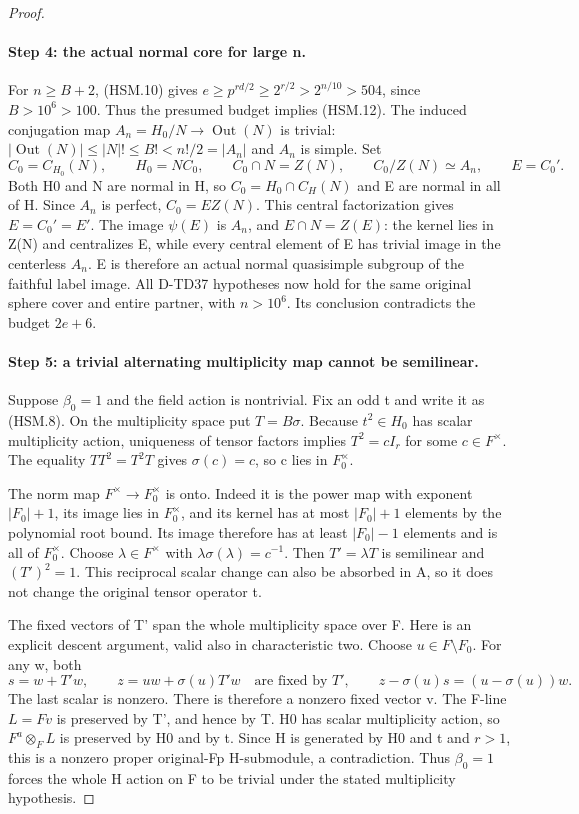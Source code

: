 \begin{proof}
\paragraph{Step 4: the actual normal core for large n.}
For \(n\ge B+2\), (HSM.10) gives
\(e\ge p^{rd/2}\ge2^{r/2}>2^{n/10}>504\), since
\(B>10^6>100\).  Thus the presumed budget implies (HSM.12).
The induced conjugation map
\(A_n=H_0/N\to\operatorname{Out}(N)\) is trivial:
\(|\operatorname{Out}(N)|\le|N|!\le B!<n!/2=|A_n|\)
and \(A_n\) is simple.  Set
\[
 C_0=C_{H_0}(N),\qquad H_0=NC_0,\qquad
 C_0\cap N=Z(N),\qquad C_0/Z(N)\simeq A_n,
 \qquad E=C_0'.
 \tag{HSM.13}
\]
Both H0 and N are normal in H, so \(C_0=H_0\cap C_H(N)\)
and E are normal in all of H.  Since \(A_n\) is perfect,
\(C_0=E Z(N)\).  This central factorization gives
\(E=C_0'=E'\).  The image \(\psi(E)\) is \(A_n\),
and \(E\cap N=Z(E)\): the kernel lies in Z(N) and
centralizes E, while every central element of E has trivial
image in the centerless \(A_n\).  E is therefore an actual
normal quasisimple subgroup of the faithful label image.
All D-TD37 hypotheses now hold for the same original sphere
cover and entire partner, with \(n>10^6\).  Its conclusion
contradicts the budget \(2e+6\).

\paragraph{Step 5: a trivial alternating multiplicity map cannot be semilinear.}
Suppose \(\beta_0=1\) and the field action is nontrivial.
Fix an odd t and write it as (HSM.8).  On the multiplicity
space put \(T=B\sigma\).  Because \(t^2\in H_0\)
has scalar multiplicity action, uniqueness of tensor factors
implies \(T^2=cI_r\) for some \(c\in F^\times\).
The equality \(TT^2=T^2T\) gives \(\sigma(c)=c\),
so c lies in \(F_0^\times\).

The norm map \(F^\times\to F_0^\times\) is onto.
Indeed it is the power map with exponent \(|F_0|+1\),
its image lies in \(F_0^\times\), and its kernel has
at most \(|F_0|+1\) elements by the polynomial root bound.
Its image therefore has at least \(|F_0|-1\) elements and
is all of \(F_0^\times\).  Choose \(\lambda\in F^\times\) with
\(\lambda\sigma(\lambda)=c^{-1}\).  Then
\(T'=\lambda T\) is semilinear and \((T')^2=1\).
This reciprocal scalar change can also be absorbed in A, so it
does not change the original tensor operator t.

The fixed vectors of T' span the whole multiplicity space over F.
Here is an explicit descent argument, valid also in characteristic
two.  Choose \(u\in F\setminus F_0\).  For any w, both
\[
 s=w+T'w,\qquad z=uw+\sigma(u)T'w
 \quad\text{are fixed by }T',\qquad
 z-\sigma(u)s=(u-\sigma(u))w.
 \tag{HSM.14}
\]
The last scalar is nonzero.  There is therefore a nonzero fixed
vector v.  The F-line \(L=Fv\) is preserved by T', and
hence by T.  H0 has scalar multiplicity action, so
\(F^a\otimes_F L\) is preserved by H0 and by t.
Since H is generated by H0 and t and \(r>1\), this is a
nonzero proper original-Fp H-submodule, a contradiction.
Thus \(\beta_0=1\) forces the whole H action on F to be
trivial under the stated multiplicity hypothesis.


\end{proof}
